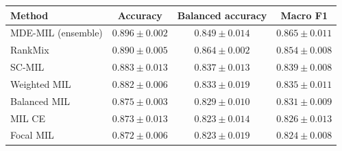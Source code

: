 \begin{tabular}{lccc}
\toprule
Method & Accuracy & Balanced accuracy & Macro F1\\
\midrule
MDE-MIL (ensemble) & $\num{0.896} \pm \num{0.002}$ & $\num{0.849} \pm \num{0.014}$ & $\num{0.865} \pm \num{0.011}$\\
RankMix & $\num{0.890} \pm \num{0.005}$ & $\num{0.864} \pm \num{0.002}$ & $\num{0.854} \pm \num{0.008}$\\
SC-MIL & $\num{0.883} \pm \num{0.013}$ & $\num{0.837} \pm \num{0.013}$ & $\num{0.839} \pm \num{0.008}$\\
Weighted MIL & $\num{0.882} \pm \num{0.006}$ & $\num{0.833} \pm \num{0.019}$ & $\num{0.835} \pm \num{0.011}$\\
Balanced MIL & $\num{0.875} \pm \num{0.003}$ & $\num{0.829} \pm \num{0.010}$ & $\num{0.831} \pm \num{0.009}$\\
MIL CE & $\num{0.873} \pm \num{0.013}$ & $\num{0.823} \pm \num{0.014}$ & $\num{0.826} \pm \num{0.013}$\\
Focal MIL & $\num{0.872} \pm \num{0.006}$ & $\num{0.823} \pm \num{0.019}$ & $\num{0.824} \pm \num{0.008}$\\
\bottomrule
\end{tabular}
